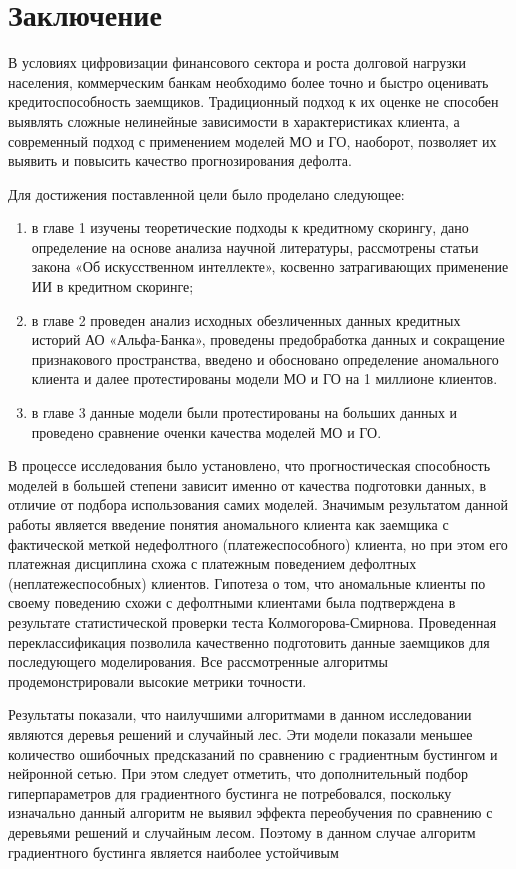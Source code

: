 \section*{Заключение}

В условиях цифровизации финансового сектора и роста долговой нагрузки населения, коммерческим банкам необходимо более точно и быстро оценивать кредитоспособность заемщиков. Традиционный подход к их оценке не способен выявлять сложные нелинейные зависимости в характеристиках клиента, а современный подход с применением моделей МО и ГО, наоборот, позволяет их выявить и повысить качество прогнозирования дефолта. 

Для достижения поставленной цели было проделано следующее:
\begin{enumerate}[nosep]
	\item в главе 1 изучены теоретические подходы к кредитному скорингу, дано определение на основе анализа научной литературы, рассмотрены статьи закона «Об искусственном интеллекте», косвенно затрагивающих применение ИИ в кредитном скоринге;
	\item в главе 2 проведен анализ исходных обезличенных данных кредитных историй АО «Альфа-Банка», проведены предобработка данных и сокращение признакового пространства, введено и обосновано определение аномального клиента и далее протестированы модели МО и ГО на 1 миллионе клиентов.
	\item в главе 3 данные модели были протестированы на больших данных и проведено сравнение оченки качества моделей МО и ГО.
\end{enumerate} 

В процессе исследования было установлено, что прогностическая способность моделей в большей степени зависит именно от качества подготовки данных, в отличие от подбора использования самих моделей. Значимым результатом данной работы является введение понятия аномального клиента как заемщика с фактической меткой недефолтного (платежеспособного) клиента, но при этом его платежная дисциплина схожа с платежным поведением дефолтных (неплатежеспособных) клиентов. Гипотеза о том, что аномальные клиенты по своему поведению схожи с дефолтными клиентами была подтверждена в результате статистической проверки теста Колмогорова-Смирнова. Проведенная переклассификация позволила качественно подготовить данные заемщиков для последующего моделирования. Все рассмотренные алгоритмы продемонстрировали высокие метрики точности.

Результаты показали, что наилучшими алгоритмами в данном исследовании являются деревья решений и случайный лес. Эти модели показали меньшее количество ошибочных предсказаний по сравнению с градиентным бустингом и нейронной сетью. При этом следует отметить, что дополнительный подбор гиперпараметров для градиентного бустинга не потребовался, поскольку изначально данный алгоритм не выявил эффекта переобучения по сравнению с деревьями решений и случайным лесом. Поэтому в данном случае алгоритм градиентного бустинга является наиболее устойчивым

